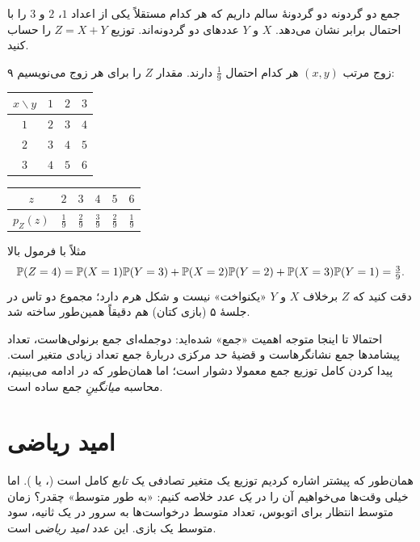 \begin{example}[label=ex:sum-two]{جمع دو گردونه}
  دو گردونهٔ سالم داریم که هر کدام مستقلاً یکی از اعداد $1$، $2$ و $3$ را با احتمال برابر نشان می‌دهد. $X$ و $Y$ عددهای دو گردونه‌اند. توزیع $Z=X+Y$ را حساب کنید.
  \begin{solution}
    ۹ زوج مرتب $(x,y)$ هر کدام احتمال $\tfrac19$ دارند. مقدار $Z$ را برای هر زوج می‌نویسیم:
    \begin{center}
      \renewcommand{\arraystretch}{1.2}
      \begin{tabular}{c|ccc}
        $x\backslash y$ & $1$ & $2$ & $3$ \\\hline
        $1$             & $2$ & $3$ & $4$ \\
        $2$             & $3$ & $4$ & $5$ \\
        $3$             & $4$ & $5$ & $6$
      \end{tabular}
      \qquad\qquad
      \begin{tabular}{c|ccccc}
        $z$      & $2$        & $3$        & $4$        & $5$        & $6$        \\\hline
        $p_Z(z)$ & $\tfrac19$ & $\tfrac29$ & $\tfrac39$ & $\tfrac29$ & $\tfrac19$
      \end{tabular}
    \end{center}
    مثلاً با فرمول بالا
    \[ \P(Z=4)=\P(X=1)\P(Y=3)+\P(X=2)\P(Y=2)+\P(X=3)\P(Y=1)=\tfrac39. \]
    دقت کنید که $Z$ برخلاف $X$ و $Y$ «یکنواخت» نیست و شکل هرم دارد؛ مجموع دو تاس در جلسهٔ ۵ (بازی کتان) هم دقیقاً همین‌طور ساخته شد.
  \end{solution}
\end{example}

\begin{note}
  احتمالا تا اینجا متوجه اهمیت «جمع» شده‌اید: دوجمله‌ای جمع برنولی‌هاست، تعداد پیشامدها جمع نشانگرهاست و قضیهٔ حد مرکزی دربارهٔ جمع تعداد زیادی متغیر است. پیدا کردن کامل توزیع جمع معمولا دشوار است؛ اما همان‌طور که در ادامه می‌بینیم، محاسبه \emph{میانگینِ} جمع ساده است.
\end{note}

\section{امید ریاضی}
\label{sec:expect}

همان‌طور که پیشتر اشاره کردیم توزیع یک متغیر تصادفی یک \emph{تابع} کامل است (،  یا ). اما خیلی وقت‌ها می‌خواهیم آن را در \emph{یک عدد} خلاصه کنیم: «به طور متوسط» چقدر؟ زمان متوسط انتظار برای اتوبوس، تعداد متوسط درخواست‌ها به سرور در یک ثانیه، سود متوسط یک بازی. این عدد \emph{امید ریاضی} است.


